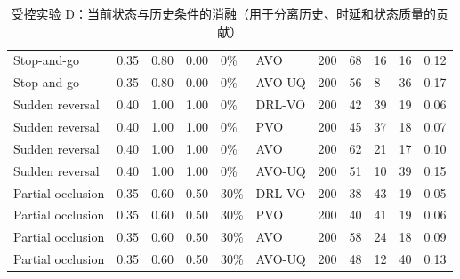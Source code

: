 \documentclass[UTF8,10pt,a4paper,twocolumn]{ctexart}
\begin{document}
\begin{table}[!t]
{\begin{tabular}{p{}p{}p{}p{}p{}p{}p{}p{}p{}p{}p{}}
        Stop-and-go & 0.35 & 0.80 & 0.00 & 0\% & AVO & 200 & 68 & 16 & 16 & 0.12 \\
        Stop-and-go & 0.35 & 0.80 & 0.00 & 0\% & AVO-UQ & 200 & 56 & 8 & 36 & 0.17 \\
        Sudden reversal & 0.40 & 1.00 & 1.00 & 0\% & DRL-VO & 200 & 42 & 39 & 19 & 0.06 \\
        Sudden reversal & 0.40 & 1.00 & 1.00 & 0\% & PVO & 200 & 45 & 37 & 18 & 0.07 \\
        Sudden reversal & 0.40 & 1.00 & 1.00 & 0\% & AVO & 200 & 62 & 21 & 17 & 0.10 \\
        Sudden reversal & 0.40 & 1.00 & 1.00 & 0\% & AVO-UQ & 200 & 51 & 10 & 39 & 0.15 \\
        Partial occlusion & 0.35 & 0.60 & 0.50 & 30\% & DRL-VO & 200 & 38 & 43 & 19 & 0.05 \\
        Partial occlusion & 0.35 & 0.60 & 0.50 & 30\% & PVO & 200 & 40 & 41 & 19 & 0.06 \\
        Partial occlusion & 0.35 & 0.60 & 0.50 & 30\% & AVO & 200 & 58 & 24 & 18 & 0.09 \\
        Partial occlusion & 0.35 & 0.60 & 0.50 & 30\% & AVO-UQ & 200 & 48 & 12 & 40 & 0.13 \\
        \bottomrule
    \end{tabular}}
\par
\vspace{8pt}
\centering
    \caption{受控实验 D：当前状态与历史条件的消融（用于分离历史、时延和状态质量的贡献）}
    \label{tab:controlled_history}
    \scriptsize
\end{table}
\end{document}
